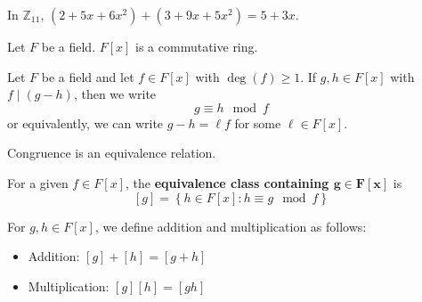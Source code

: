 \begin{exbox}
    \begin{example}
    In $ \mathbb{Z}_{11} $, $ (2+5x+6x^2)+(3+9x+5x^2)=5+3x $.
    \end{example}
\end{exbox}

\begin{thmbox}
    \begin{theorem}
        Let $ F $ be a field. $ F[x] $ is a commutative ring.
    \end{theorem}
\end{thmbox}

\begin{defbox}
    \begin{definition}
        Let $ F $ be a field and let $ f\in F[x] $ with $ \deg(f)\geqslant 1 $.
        If $ g,h\in F[x] $ with $ f\mid (g-h) $, then we write
        \[ g\equiv h \mod f \]
        or equivalently, we can write $ g-h=\ell f $ for some $ \ell\in F[x] $.
    \end{definition}
\end{defbox}

\begin{thmbox}
    \begin{theorem}
        Congruence is an equivalence relation.
    \end{theorem}
\end{thmbox}

\begin{defbox}
    \begin{definition}
        For a given $ f\in F[x] $, the \textbf{equivalence class containing $\bm{g\in F[x]}$}
        is
        \[ [g]=\left\{h\in F[x]: h\equiv g \mod f\right\} \]
    \end{definition}
\end{defbox}

\begin{defbox}
    \begin{definition}
        For $ g,h\in F[x] $, we define addition and multiplication as follows:
        \begin{itemize}
            \item Addition: $ [g]+[h]=[g+h] $
            \item Multiplication: $ [g][h]=[gh] $
        \end{itemize}
    \end{definition}
\end{defbox}

